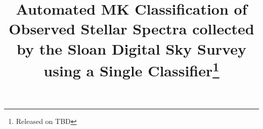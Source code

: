 \documentclass[trackchanges, floatfix, twocolumn, tighten]{aastex62}
\begin{document}
\title{Automated MK Classification of Observed Stellar Spectra collected by the Sloan Digital Sky Survey using a Single Classifier\footnote{Released on TBD}}


\end{document}
